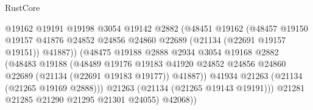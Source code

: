 \begin{lexlean}{RustCore}
\begin{coremodule}
                                          @19162
                                          @19191
                                          @19198
                                          @3054
                                          @19142
                                          @2882
                                          (@48451
                                            @19162
                                            (@48457
                                              @19150
                                              @19157
                                              @41876
                                              @24852
                                              @24856
                                              @24860
                                              @22689
                                              (@21134 (@22691 @19157 @19151))
                                              @41887))
                                          (@48475
                                            @19188
                                            @2888
                                            @2934
                                            @3054
                                            @19168
                                            @2882
                                            (@48483
                                              @19188
                                              (@48489
                                                @19176
                                                @19183
                                                @41920
                                                @24852
                                                @24856
                                                @24860
                                                @22689
                                                (@21134 (@22691 @19183 @19177))
                                                @41887))
                                            @41934
                                            @21263
                                            (@21134 (@21265 @19169 @2888)))
                                          @21263
                                          (@21134 (@21265 @19143 @19191)))
                                        @21281
                                        @21285
                                        @21290
                                        @21295
                                        @21301
                                        @24055)
                                      @42068))

\end{coremodule}
\end{lexlean}
